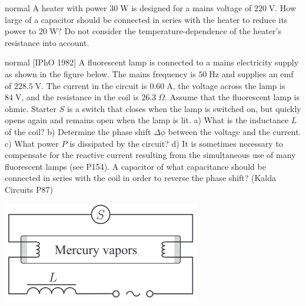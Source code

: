 \hypertarget{P152}{}
\begin{solution}{normal} %
A heater with power $30\;\text{W}$ is designed for a mains voltage of $220\;\text{V}$. How large of a capacitor should be connected in series with the heater to reduce its power to $20\;\text{W}$? Do not consider the temperature-dependence of the heater's resistance into account.
\end{solution}

\hypertarget{P153}{}
\begin{solution}{normal} %
[IPhO 1982] A fluorescent lamp is connected to a mains electricity supply as shown in the figure below. The mains frequency is $50\;\text{Hz}$ and supplies an emf of $228.5\;\text{V}$. The current in the circuit is $0.60\;\text{A}$, the voltage across the lamp is $84\;\text{V}$, and the resistance in the coil is $26.3\;\Omega$. Assume that the fluorescent lamp is ohmic. Starter $S$ is a switch that closes when the lamp is switched on, but quickly opens again and remains open when the lamp is lit. a) What is the inductance $L$ of the coil? b) Determine the phase shift $\Delta\phi$ between the voltage and the current. c) What power $P$ is dissipated by the circuit? d) It is sometimes necessary to compensate for the reactive current resulting from the simultaneous use of many fluorescent lamps (see P154). A capacitor of what capacitance should be connected in series with the coil in order to reverse the phase shift? (Kalda Circuits P87)
\begin{center}
    \includegraphics[width=0.65\textwidth]{S6 Figures/S6-153.png}
\end{center}
\end{solution}

